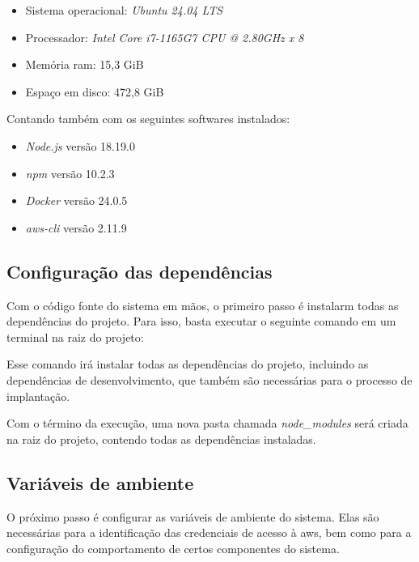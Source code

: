 \begin{itemize}
    \item Sistema operacional: \textit{Ubuntu 24.04 LTS}
    \item Processador: \textit{Intel Core i7-1165G7 CPU @ 2.80GHz x 8}
    \item Memória \gls{ram}: 15,3 GiB 
    \item Espaço em disco: 472,8 GiB
\end{itemize}

Contando também com os seguintes softwares instalados:

\begin{itemize}
    \item \textit{Node.js} versão 18.19.0
    \item \textit{npm} versão 10.2.3
    \item \textit{Docker} versão 24.0.5
    \item \textit{aws-cli} versão 2.11.9
\end{itemize}

\subsection{Configuração das dependências}
\label{subsec:configuracaoDasDependencias}

Com o código fonte do sistema em mãos, o primeiro passo é instalarm todas as dependências do projeto. Para isso, basta executar o seguinte comando em um terminal na raiz do projeto:


Esse comando irá instalar todas as dependências do projeto, incluindo as dependências de desenvolvimento, que também são necessárias para o processo de implantação.

Com o término da execução, uma nova pasta chamada \textit{node\_modules} será criada na raiz do projeto, contendo todas as dependências instaladas.

\subsection{Variáveis de ambiente}
\label{subsec:variaveisDeAmbienteEFeatureFlags}

O próximo passo é configurar as variáveis de ambiente do sistema. Elas são necessárias para a identificação das credenciais de acesso à \gls{aws}, bem como para a configuração do comportamento de certos componentes do sistema.

